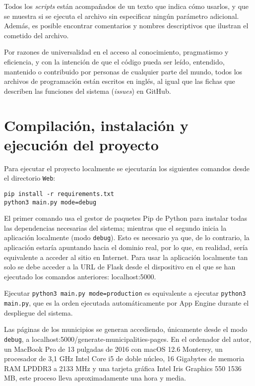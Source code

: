 Todos los \textit{scripts} están acompañados de un texto que indica cómo usarlos, y que se muestra si se ejecuta el archivo sin especificar ningún parámetro adicional. Además, es posible encontrar comentarios y nombres descriptivos que ilustran el cometido del archivo.

Por razones de universalidad en el acceso al conocimiento, pragmatismo y eficiencia, y con la intención de que el código pueda ser leído, entendido, mantenido o contribuido por personas de cualquier parte del mundo, todos los archivos de programación están escritos en inglés, al igual que las fichas que describen las funciones del sistema (\textit{issues}) en GitHub.

\section{Compilación, instalación y ejecución del proyecto}

Para ejecutar el proyecto localmente se ejecutarán los siguientes comandos desde el directorio \texttt{Web}:

\begin{verbatim}
pip install -r requirements.txt
python3 main.py mode=debug
\end{verbatim}

El primer comando usa el gestor de paquetes Pip de Python para instalar todas las dependencias necesarias del sistema; mientras que el segundo inicia la aplicación localmente (modo \texttt{debug}). Esto es necesario ya que, de lo contrario, la aplicación estaría apuntando hacia el dominio real, por lo que, en realidad, sería equivalente a acceder al sitio en Internet. Para usar la aplicación localmente tan solo se debe acceder a la URL de Flask desde el dispositivo en el que se han ejecutado los comandos anteriores: localhost:5000.

Ejecutar \texttt{python3 main.py mode=production} es equivalente a ejecutar \texttt{python3 main.py}, que es la orden ejecutada automáticamente por App Engine durante el despliegue del sistema.

Las páginas de los municipios se generan accediendo, únicamente desde el modo \texttt{debug}, a localhost:5000/generate-municipalities-pages. En el ordenador del autor, un MacBook Pro de 13 pulgadas de 2016 con macOS 12.6 Monterey, un procesador de 3,1 GHz Intel Core i5 de doble núcleo, 16 Gigabytes de memoria RAM LPDDR3 a 2133 MHz y una tarjeta gráfica Intel Iris Graphics 550 1536 MB, este proceso lleva aproximadamente una hora y media.

